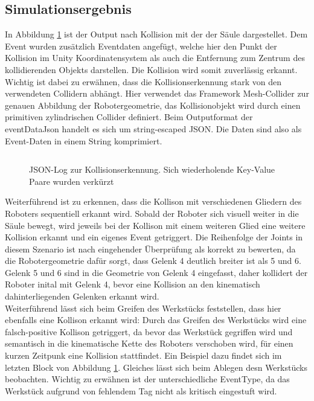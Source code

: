 \subsection{Simulationsergebnis}

In Abbildung \ref{listing:collisiondetectionerror} ist der Output nach Kollision
mit der der Säule dargestellet. Dem Event wurden zusätzlich Eventdaten angefügt,
welche hier den Punkt der Kollision im Unity Koordinatensystem als auch die
Entfernung zum Zentrum des kollidierenden Objekts darstellen. Die Kollision wird
somit zuverlässig erkannt. Wichtig ist dabei zu erwähnen, dass die
Kollisionserkennung stark von den verwendeten Collidern abhängt. Hier verwendet
das Framework Mesh-Collider zur genauen Abbildung der Robotergeometrie, das
Kollisionobjekt wird durch einen primitiven zylindrischen Collider definiert.
Beim Outputformat der eventDataJson handelt es sich um string-escaped JSON. Die
Daten sind also als Event-Daten in einem String komprimiert.\\

\begin{figure}[H]
  \inputminted[fontsize=\footnotesize]{json}{code-snippets/collisiondetection.json}
  \caption{JSON-Log zur Kollisionserkennung. Sich wiederholende
    Key-Value Paare wurden
  verkürzt}
  \label{listing:collisiondetectionerror}
\end{figure}

\noindent
Weiterführend ist zu erkennen, dass die Kollison mit verschiedenen Gliedern des
Roboters sequentiell erkannt wird. Sobald der Roboter sich visuell weiter in die
Säule bewegt, wird jeweils bei der Kollison mit einem weiteren Glied eine
weitere Kollision erkannt und ein eigenes Event getriggert. Die Reihenfolge der
Joints in diesem Szenario ist nach eingehender Überprüfung als korrekt zu
bewerten, da die Robotergeometrie dafür sorgt, dass Gelenk 4 deutlich breiter
ist als 5 und 6. Gelenk 5 und 6 sind in die Geometrie von Gelenk 4 eingefasst,
daher kollidert der Roboter inital mit Gelenk 4, bevor eine Kollision an den
kinematisch dahinterliegenden Gelenken erkannt wird.\\

\noindent Weiterführend lässt sich beim Greifen des Werkstücks feststellen, dass
hier ebenfalls eine Kollison erkannt wird: Durch das Greifen des Werkstücks wird
eine falsch-positive Kollison getriggert, da bevor das Werkstück gegriffen wird
und semantisch in die kinematische Kette des Roboters verschoben wird, für einen
kurzen Zeitpunk eine Kollision stattfindet. Ein Beispiel dazu findet sich im
letzten Block von Abbildung \ref{listing:collisiondetectionerror}. Gleiches
lässt sich beim Ablegen desn Werkstücks beobachten. Wichtig zu erwähnen ist der
unterschiedliche EventType, da das Werkstück aufgrund von fehlendem Tag nicht
als kritisch eingestuft wird.

